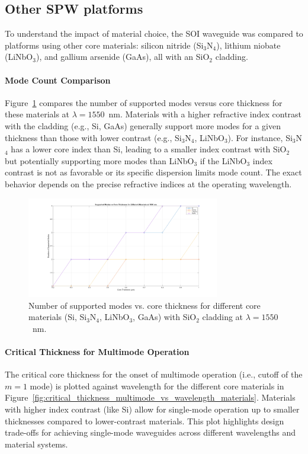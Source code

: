 \documentclass[10pt, a4paper]{article}
\begin{document}
\subsection{Other SPW platforms}
To understand the impact of material choice, the SOI waveguide was compared to platforms using other core materials: silicon nitride (Si$_3$N$_4$), lithium niobate (LiNbO$_3$), and gallium arsenide (GaAs), all with an SiO$_2$ cladding.

\paragraph{Mode Count Comparison}
Figure~\ref{fig:modes_vs_thickness_materials_1550nm} compares the number of supported modes versus core thickness for these materials at $\lambda = 1550$~nm. Materials with a higher refractive index contrast with the cladding (e.g., Si, GaAs) generally support more modes for a given thickness than those with lower contrast (e.g., Si$_3$N$_4$, LiNbO$_3$). For instance, Si$_3$N$_4$ has a lower core index than Si, leading to a smaller index contrast with SiO$_2$ but potentially supporting more modes than LiNbO$_3$ if the LiNbO$_3$ index contrast is not as favorable or its specific dispersion limits mode count. The exact behavior depends on the precise refractive indices at the operating wavelength.

\begin{figure}[h!]
    \centering
    \includegraphics[width=0.75\textwidth]{task1/modes_vs_thickness_materials_1550nm.png}
    \caption{Number of supported modes vs. core thickness for different core materials (Si, Si$_3$N$_4$, LiNbO$_3$, GaAs) with SiO$_2$ cladding at $\lambda = 1550$~nm.}
    \label{fig:modes_vs_thickness_materials_1550nm}
\end{figure}

\paragraph{Critical Thickness for Multimode Operation}
The critical core thickness for the onset of multimode operation (i.e., cutoff of the $m=1$ mode) is plotted against wavelength for the different core materials in Figure~\ref{fig:critical_thickness_multimode_vs_wavelength_materials}. Materials with higher index contrast (like Si) allow for single-mode operation up to smaller thicknesses compared to lower-contrast materials. This plot highlights design trade-offs for achieving single-mode waveguides across different wavelengths and material systems.
\end{document}
